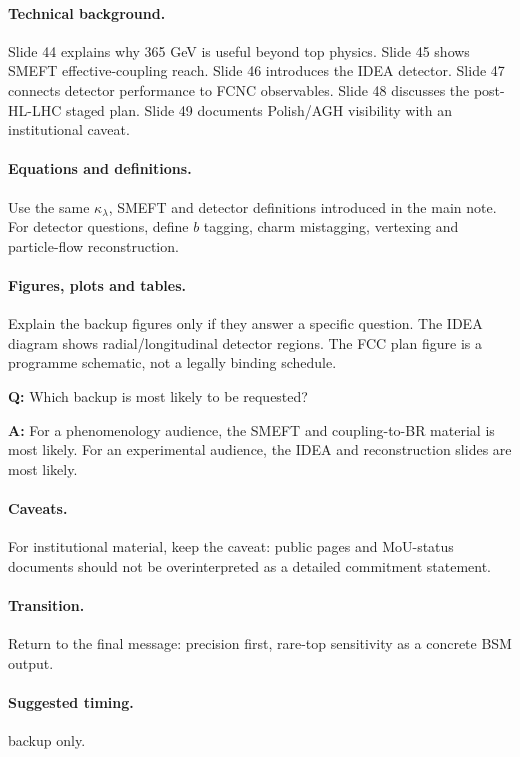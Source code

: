 \documentclass[11pt,a4paper]{report}
\begin{document}
\paragraph{Technical background.}
Slide 44 explains why 365 GeV is useful beyond top physics.  Slide 45 shows SMEFT effective-coupling reach.  Slide 46 introduces the IDEA detector.  Slide 47 connects detector performance to FCNC observables.  Slide 48 discusses the post-HL-LHC staged plan.  Slide 49 documents Polish/AGH visibility with an institutional caveat.

\paragraph{Equations and definitions.}
Use the same $\kappa_\lambda$, SMEFT and detector definitions introduced in the main note.  For detector questions, define $b$ tagging, charm mistagging, vertexing and particle-flow reconstruction.

\paragraph{Figures, plots and tables.}
Explain the backup figures only if they answer a specific question.  The IDEA diagram shows radial/longitudinal detector regions.  The FCC plan figure is a programme schematic, not a legally binding schedule.

\begin{questionbox}
\textbf{Q:} Which backup is most likely to be requested?\par
\textbf{A:} For a phenomenology audience, the SMEFT and coupling-to-BR material is most likely.  For an experimental audience, the IDEA and reconstruction slides are most likely.
\end{questionbox}

\paragraph{Caveats.}
For institutional material, keep the caveat: public pages and MoU-status documents should not be overinterpreted as a detailed commitment statement.

\paragraph{Transition.}
Return to the final message: precision first, rare-top sensitivity as a concrete BSM output.

\paragraph{Suggested timing.}
backup only.
\end{document}

